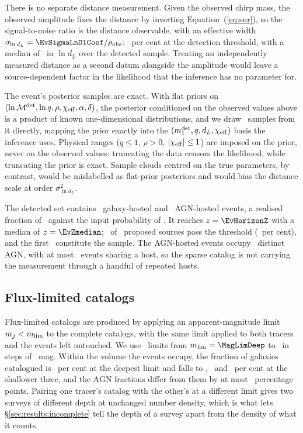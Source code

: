 There is no separate distance measurement. Given the observed chirp mass, the
observed amplitude fixes the distance by inverting Equation~(\ref{eq:snr}), so
the signal-to-noise ratio is the distance observable, with an effective width
$\sigma_{\ln d_L} = \EvSigmaLnDlCoef/\rho_{\rm obs}$: \EvSigmaLnDlThresh\
per cent at the detection threshold, with a median of \EvSigmaLnDlMedian\ in
$\ln d_L$ over the detected sample. Treating an independently measured
distance as a second datum alongside the amplitude would leave a
source-dependent factor in the likelihood that the inference has no parameter
for.

The event's posterior samples are exact. With flat priors on
$(\ln \mathcal{M}^{\rm det}, \ln q, \rho, \chi_{\rm eff}, \alpha, \delta)$,
the posterior conditioned on the observed values above is a product of known
one-dimensional distributions, and we draw \EvNsamp\ samples from it directly,
mapping the prior exactly into the $(m_1^{\rm det}, q, d_L, \chi_{\rm eff})$
basis the inference uses. Physical ranges ($q \leq 1$, $\rho > 0$,
$|\chi_{\rm eff}| \leq 1$) are imposed on the prior, never on the observed
values: truncating the data censors the likelihood, while truncating the
prior is exact. Sample clouds centred on the true parameters, by contrast,
would be mislabelled as flat-prior posteriors and would bias the distance
scale at order $\sigma_{\ln d_L}^2$.

The detected set contains \EvNhostGal\ galaxy-hosted and \EvNhostAgn\
AGN-hosted events, a realised fraction of \EvFagnReal\ against the input
probability of \EvFagn. It reaches $z = \EvHorizonZ$ with a median of
$z = \EvZmedian$; \EvNdetTotal\ of \EvNproposed\ proposed sources pass the
threshold (\EvDetFrac\ per cent), and the first \EvNobs\ constitute the
sample. The AGN-hosted events occupy \EvNuniqueAgn\ distinct AGN, with at most
\EvMaxPerAgn\ events sharing a host, so the sparse catalog is not carrying the
measurement through a handful of repeated hosts.

\subsection{Flux-limited catalogs}
\label{sec:data:survey}

Flux-limited catalogs are produced by applying an apparent-magnitude limit
$m_j < m_{\rm lim}$ to the complete catalogs, with the same limit applied to
both tracers and the events left untouched. We use \MagLimN\ limits from
$m_{\rm lim} = \MagLimDeep$ to \MagLimShallow\ in steps of \MagLimStep\ mag.
Within the volume the events occupy, the fraction of galaxies catalogued is
\CompMTwentyOne\ per cent at the deepest limit and falls to \CompMTwenty,
\CompMNineteen\ and \CompMEighteen\ per cent at the shallower three, and the
AGN fractions differ from them by at most \CompAgnMaxDev\ percentage points.
Pairing one tracer's catalog with the other's at a different limit gives two
surveys of different depth at unchanged number density, which is what lets
\S\ref{sec:results:incomplete} tell the depth of a survey apart from the
density of what it counts.

